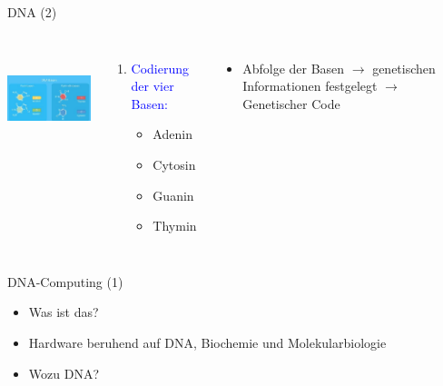 \documentclass{beamer}
\begin{document}
\begin{frame}{DNA (2)}
	\begin{columns}
	\centering
	\includegraphics[height=3cm, width=5cm]{./7.jpg}%
		
	\begin{enumerate}
	\item \textcolor{blue}{Codierung der vier Basen:}
 	\begin{itemize}
 	\item Adenin \item Cytosin
 	\item Guanin \item Thymin 
     \end{itemize} 
	\end{enumerate}

\begin{itemize}	
	\item Abfolge der Basen $\rightarrow$  genetischen Informationen festgelegt $\rightarrow$ Genetischer Code	
\end{itemize} 

\end{columns} 
\end{frame}

\begin{frame}{DNA-Computing (1)}

	\begin{itemize}	
	\item 	Was ist das?
\pause	\item Hardware beruhend auf DNA, Biochemie und Molekularbiologie
\pause	\item 	Wozu DNA?
\end{itemize} 
	
\end{frame}
\end{document}
